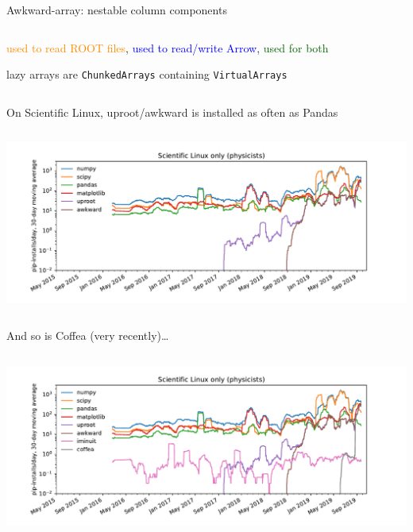 \documentclass[aspectratio=169]{beamer}
\begin{document}
\begin{frame}{Awkward-array: nestable column components}
\begin{columns}
\vspace{-0.25 cm}
\begin{center}
\begin{minipage}{0.63\linewidth}
\small
\textcolor{darkorange}{used to read ROOT files}, \textcolor{blue}{used to read/write Arrow}, \textcolor{darkgreen}{used for both}

lazy arrays are \texttt{ChunkedArrays} containing \texttt{VirtualArrays}
\end{minipage}
\end{center}
\end{columns}
\end{frame}

\begin{frame}{On Scientific Linux, uproot/awkward is installed as often as Pandas}
\vspace{0.5 cm}
\begin{columns}
\includegraphics[width=\linewidth]{pip-scilinux-uproot.pdf}
\end{columns}
\end{frame}

\begin{frame}{And so is Coffea (very recently)\ldots}
\vspace{0.5 cm}
\begin{columns}
\includegraphics[width=\linewidth]{pip-scilinux-uproot-iminuit.pdf}
\end{columns}
\end{frame}
\end{document}
